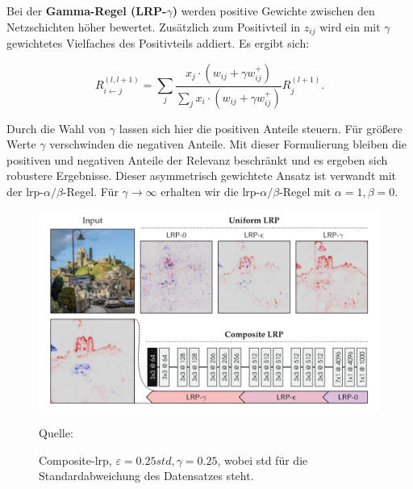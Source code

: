\documentclass[twoside, 12pt,a4paper]{book}
\newcommand{\source}[1]{\caption*{\hfill Quelle: {#1}} }
\numberwithin{equation}{section}
\begin{document}
	 \noindent Bei der \textbf{Gamma-Regel (LRP-$\gamma$)} werden positive Gewichte zwischen den Netzschichten höher bewertet. Zusätzlich zum Positivteil in $z_{ij}$ wird ein mit $\gamma$ gewichtetes Vielfaches des Positivteils addiert. Es ergibt sich:
	
	\begin{equation}
		R_{i\leftarrow j}^{(l,l+1)} = \sum_j{\frac{x_j \cdot (w_{ij}+ \gamma w_{ij}^+)}{\sum_j{x_i \cdot (w_{ij} + \gamma w_{ij}^+)}}R_j^{(l+1)}}.
	\end{equation}
	
	\noindent Durch die Wahl von $\gamma$ lassen sich hier die positiven Anteile steuern. Für größere Werte $\gamma$ verschwinden die negativen Anteile. Mit dieser Formulierung bleiben die positiven und negativen Anteile der Relevanz beschränkt und es ergeben sich robustere Ergebnisse. Dieser asymmetrisch gewichtete Ansatz ist verwandt mit der \ac{lrp}-$\alpha/\beta$-Regel. Für $\gamma \to \infty$ erhalten wir die \ac{lrp}-$\alpha/\beta$-Regel mit $\alpha=1,\beta=0$.
	
	
	\begin{figure}[ht]
		\centering
		\includegraphics[width=0.3\textheight]{composite_lrp.png}
		\caption[Composite-LRP]{Composite-\ac{lrp}, $\varepsilon=0.25std, \gamma=0.25$, wobei std für die Standardabweichung des Datensatzes steht.}
		\source{\cite{samek2019explainable}}
		\label{im:composite_lrp}
	\end{figure}
	
\end{document}
